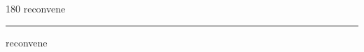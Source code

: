 
\begin{frame}
\begin{center}
\begin{turn}{180}
{\fontsize{2.5cm}{1em}\selectfont reconvene}
\end{turn}
\vspace{1em}\par  
\hrule
\vspace{1em}\par  
{\fontsize{2.5cm}{1em}\selectfont reconvene}
\end{center}
\end{frame}

